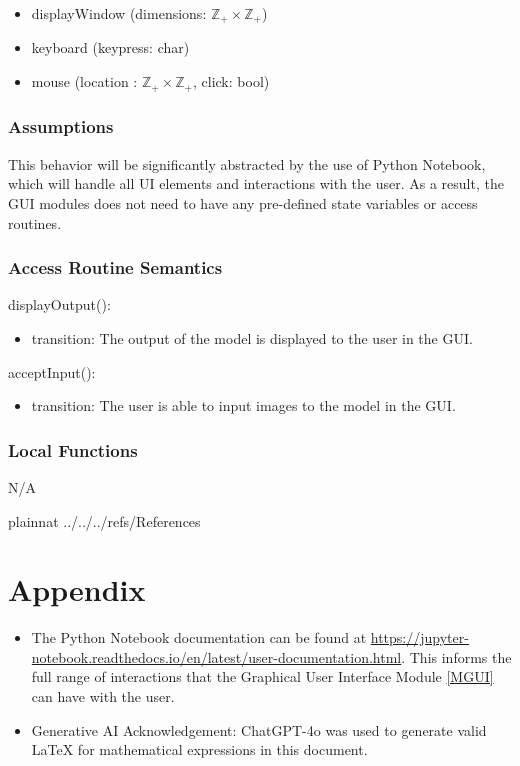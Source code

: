 \documentclass[12pt, titlepage]{article}
\begin{document}
\begin{itemize}
  \item displayWindow (dimensions: $\mathbb{Z}_+ \times \mathbb{Z}_+$)
  \item keyboard (keypress: char)
  \item mouse (location : $\mathbb{Z}_+ \times \mathbb{Z}_+$, click: bool)
\end{itemize}

\subsubsection{Assumptions}

This behavior will be significantly abstracted by the use of Python Notebook,
which will handle all UI elements and interactions with the user. As a result,
the GUI modules does not need to have any pre-defined state variables or access
routines.

\subsubsection{Access Routine Semantics}

\noindent displayOutput():
\begin{itemize}
\item transition: The output of the model is displayed to the user in the GUI.
\end{itemize}

\noindent acceptInput():
\begin{itemize}
\item transition: The user is able to input images to the model in the GUI.
\end{itemize}

\subsubsection{Local Functions}

N/A

\newpage

 {plainnat}
 {../../../refs/References}

\newpage

\section{Appendix} \label{Appendix}

\begin{itemize}
  \item The Python Notebook documentation can be found at \url{https://jupyter-notebook.readthedocs.io/en/latest/user-documentation.html}. This informs the full range
  of interactions that the Graphical User Interface Module \ref{MGUI} can have
  with the user.
  \item Generative AI Acknowledgement: ChatGPT-4o was used to generate valid
  LaTeX for mathematical expressions in this document.
\end{itemize}

\newpage{}
\end{document}
